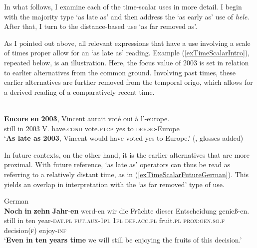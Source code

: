 In what follows, I examine each of the time-scalar uses in more detail. I begin with the majority type \lq as late as\rq{} and then address the \lq as early as\rq{ }use of  \textit{hele}. After that, I turn to the distance-based use \lq as far removed as\rq{}.

As I pointed out above, all relevant expressions that have a use involving a scale of times proper  allow for an \lq as late as\rq{ }reading. Example (\ref{exTimeScalarIntro}), repeated below, is an illustration. Here, the focus value of 2003 is set in relation to earlier alternatives from the common ground. Involving past times, these earlier alternatives are further removed from the temporal origo, which allows for a derived reading of a comparatively recent time.

\begin{exe}
	\\
	 \gll \textbf{Encore} \textbf{en} \textbf{2003}, Vincent aurait voté oui à l'-europe.\\
	still in 2003 V. have.\textsc{cond} vote.\textsc{ptcp} yes to \textsc{def}.\textsc{sg}-Europe\\
	\glt \lq \textbf{As late as 2003}, Vincent would have voted yes to Europe.' (\cite[160–161]{MosegaardHansen2008},  glosses added)
\end{exe}

In future contexts, on the other hand, it is the earlier alternatives that are more proximal. With future reference, \lq as late as\rq{ }operators can thus be read as referring to a relatively distant time, as in (\ref{exTimeScalarFutureGerman}). This yields an overlap in interpretation with the \lq as far removed\rq{ }type of use.

\begin{exe}
	\ex German\label{exTimeScalarFutureGerman}\\
	\gll \textbf{Noch} \textbf{in} \textbf{zehn} \textbf{Jahr}-\textbf{en} werd-en wir die Früchte dieser Entscheidung genieß-en.\\
	still in ten year-\textsc{dat}.\textsc{pl} \textsc{fut}.\textsc{aux}-1\textsc{pl} 1\textsc{pl} \textsc{def}.\textsc{acc}.\textsc{pl} fruit.\textsc{pl} \textsc{prox}:\textsc{gen}.\textsc{sg}.\textsc{f} decision(\textsc{f}) enjoy-\textsc{inf}\\
	\glt \lq \textbf{Even in ten years time} we will still be enjoying the fruits of this decision.' \parencite[182]{Koenig1979}
\end{exe}

